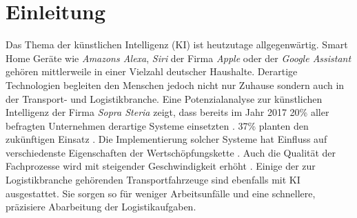 
\chapter{Einleitung}
\label{ch: Einleitung}
	

		Das Thema der künstlichen Intelligenz (KI) ist heutzutage allgegenwärtig. Smart Home Geräte wie \textit{Amazons Alexa}, \textit{Siri} der Firma \textit{Apple} oder der \textit{Google Assistant} gehören mittlerweile in einer Vielzahl deutscher Haushalte. Derartige Technologien begleiten den Menschen jedoch nicht nur Zuhause sondern auch in der Transport- und Logistikbranche. Eine Potenzialanalyse zur künstlichen Intelligenz der Firma \textit{Sopra Steria} zeigt, dass bereits im Jahr 2017 20\% aller befragten Unternehmen derartige Systeme einsetzten \cite{sopra}. 37\% planten den zukünftigen Einsatz \cite{sopra}. Die Implementierung solcher Systeme hat Einfluss auf verschiedenste Eigenschaften der Wertschöpfungskette \cite{sopra}. Auch die Qualität der Fachprozesse wird mit steigender Geschwindigkeit erhöht \cite{sopra}. Einige der zur Logistikbranche gehörenden Transportfahrzeuge sind ebenfalls mit KI ausgestattet. Sie sorgen so für weniger Arbeitsunfälle und eine schnellere, präzisiere Abarbeitung der Logistikaufgaben.\\
		
